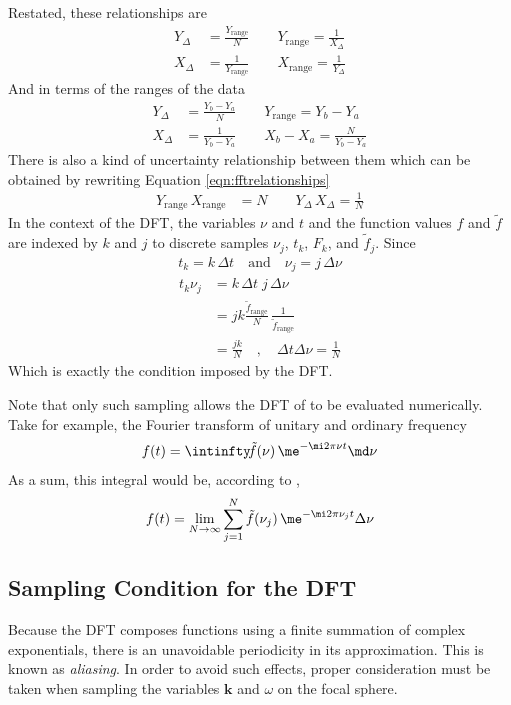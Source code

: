 Restated, these relationships are
\begin{align}
Y_\Delta &= \frac{Y_\text{range}}{N}\qquad Y_\text{range}
=\frac{1}{X_\Delta} \\
X_\Delta &= \frac{1}{Y_\text{range}}\qquad X_\text{range} = \frac{1}{Y_\Delta}
\label{eqn:fftrelationships}
\end{align}
And in terms of the ranges of the data
\begin{align}
Y_\Delta &= \frac{Y_b-Y_a}{N} \qquad Y_\text{range}=Y_b-Y_a \\
X_\Delta &= \frac{1}{Y_b-Y_a} \qquad X_b-X_a = \frac{N}{Y_b-Y_a}
\label{eqn:units1}
\end{align}
There is also a kind of uncertainty relationship between them which can be
obtained by rewriting Equation \ref{eqn:fftrelationships}
\begin{align} 
Y_\text{range} \,X_\text{range} &= N \qquad Y_\Delta\, X_\Delta= \frac{1}{N}
\end{align} 
In the context of the DFT, the variables $\nu$ and $t$ and the function
values $f$ and $\tilde{f}$ are indexed by $k$ and $j$ to discrete samples
$\nu_j$, $t_k$, $F_k$, and $\tilde{f}_j$.   Since
\begin{align}
t_k=k\,\Delta t \quad\text{and}\quad \nu_j=j\,\Delta \nu
\end{align}
\begin{align}
t_k \nu_j &= k\,\Delta t \; j\,\Delta \nu\\
&=jk \frac{\tilde{f}_\text{range}}{N}\,\frac{1}{\tilde{f}_\text{range}}\\
&=\frac{jk}{N}\quad,\quad\Delta t \Delta \nu = \frac{1}{N}
\end{align}
Which is exactly the condition imposed by the DFT.

Note that only such sampling allows the DFT of  to be
evaluated numerically.  Take for example, the Fourier transform of unitary
and ordinary frequency
\begin{align}
f(t)=\intinfty\!\tilde{f}(\nu)\,\me^{-\mi 2 \pi \nu t} \md \nu
\label{eqn:maybenu}
\end{align}
As a sum, this integral would be, according to
,
\begin{align}
f(t)= \lim_{N\to\infty} \sum_{j=1}^{N} \tilde{f}(\nu_j) \, \me^{-\mi 2\pi \nu_j t} \Delta \nu
\end{align}

\subsection{Sampling Condition for the DFT}
Because the DFT composes functions using a finite summation of complex
exponentials, there is an unavoidable periodicity in its approximation.
This is known as {\it aliasing}.  In order to avoid such effects, proper
consideration must be taken when sampling the variables $\mathbf{k}$ and
$\omega$ on the focal sphere.
